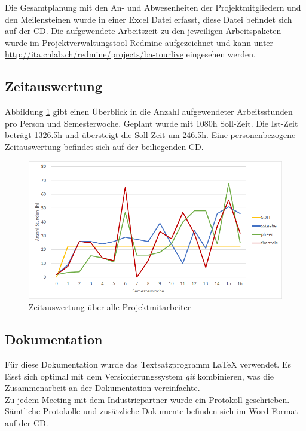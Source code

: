 Die Gesamtplanung mit den An- und Abwesenheiten der Projektmitgliedern und den Meilensteinen wurde in einer Excel Datei erfasst, diese Datei befindet sich auf der CD. Die aufgewendete Arbeitszeit zu den jeweiligen Arbeitspaketen wurde im Projektverwaltungstool Redmine aufgezeichnet und kann unter \url{http://ita.cnlab.ch/redmine/projects/ba-tourlive} eingesehen werden.
\\
\subsection{Zeitauswertung}
Abbildung \ref{fig:zeitauswertung} gibt einen Überblick in die Anzahl aufgewendeter Arbeitsstunden pro Person und Semesterwoche. Geplant wurde mit 1080h Soll-Zeit. Die Ist-Zeit beträgt 1326.5h und übersteigt die Soll-Zeit um 246.5h.  Eine personenbezogene Zeitauswertung befindet sich auf der beiliegenden CD.

\begin{figure}[H]
	\centering
	\includegraphics[width=140mm]{images/timereport.png}
	\caption{Zeitauswertung über alle Projektmitarbeiter}
	\label{fig:zeitauswertung}	
\end{figure}

\subsection{Dokumentation}
Für diese Dokumentation wurde das Textsatzprogramm {\LaTeX} verwendet. Es lässt sich optimal mit dem Versionierungssystem \textit{\gls{git}} kombinieren, was die Zusammenarbeit an der Dokumentation vereinfachte.
\\

Zu jedem Meeting mit dem Industriepartner wurde ein Protokoll geschrieben. Sämtliche Protokolle und zusätzliche Dokumente befinden sich im Word Format auf der CD.
